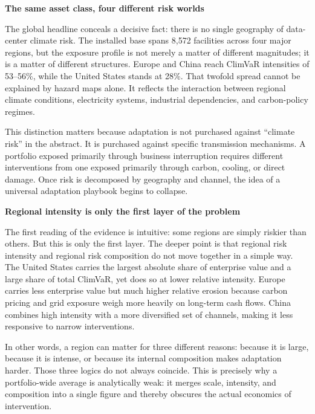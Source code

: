 \begin{twocolbody}

{\color{SEGreen}\textbf{The same asset class, four different risk worlds}}

\vspace{1mm}

\noindent The global headline conceals a decisive fact: there is no single geography of data-center climate risk. The installed base spans 8{,}572 facilities across four major regions, but the exposure profile is not merely a matter of different magnitudes; it is a matter of different structures. Europe and China reach ClimVaR intensities of 53--56\%, while the United States stands at 28\%. That twofold spread cannot be explained by hazard maps alone. It reflects the interaction between regional climate conditions, electricity systems, industrial dependencies, and carbon-policy regimes.

This distinction matters because adaptation is not purchased against ``climate risk'' in the abstract. It is purchased against specific transmission mechanisms. A portfolio exposed primarily through business interruption requires different interventions from one exposed primarily through carbon, cooling, or direct damage. Once risk is decomposed by geography and channel, the idea of a universal adaptation playbook begins to collapse.

\vspace{5mm}

{\color{SEGreen}\textbf{Regional intensity is only the first layer of the problem}}

\vspace{1mm}

\noindent The first reading of the evidence is intuitive: some regions are simply riskier than others. But this is only the first layer. The deeper point is that regional risk intensity and regional risk composition do not move together in a simple way. The United States carries the largest absolute share of enterprise value and a large share of total ClimVaR, yet does so at lower relative intensity. Europe carries less enterprise value but much higher relative erosion because carbon pricing and grid exposure weigh more heavily on long-term cash flows. China combines high intensity with a more diversified set of channels, making it less responsive to narrow interventions.

In other words, a region can matter for three different reasons: because it is large, because it is intense, or because its internal composition makes adaptation harder. Those three logics do not always coincide. This is precisely why a portfolio-wide average is analytically weak: it merges scale, intensity, and composition into a single figure and thereby obscures the actual economics of intervention.


\end{twocolbody}
